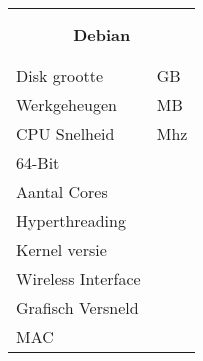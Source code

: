\documentclass[a4paper,14pt]{extarticle}
\begin{document}

\begin{center}
	\begin{tabular}{ p{8cm}| p{8cm} }
	\multicolumn{2}{c}{\Huge\bf{\textsc{\hostname{}}}} \\
	\multicolumn{2}{c}{\Large{\bf\ipaddr{}}}  \\
	\multicolumn{2}{c}{\Large\bf{Debian \debiancode{} \debianversion}}\\
	\multicolumn{2}{l}{\Large{\cpumodel{}}}  \\
	\multicolumn{2}{l}{\Large{\graphics{}}}  \\
	\hline
	\Large{Disk grootte} & \Large{\disksize{} GB}  \\
	\Large{Werkgeheugen} & \Large{\memsize{} MB} \\
	CPU Snelheid & \cpuspeed{} Mhz \\
	64-Bit & \bitssixtyfour{} \\
	Aantal Cores & \corecount{} \\
	Hyperthreading & \hyperthreading{} \\
	Kernel versie & {} \\
	Wireless Interface & \wireless \\
	Grafisch Versneld & \accelerated{} \\
	MAC & \macaddr{} \\
	\hline
\end{tabular}
\end{center}
\end{document}
